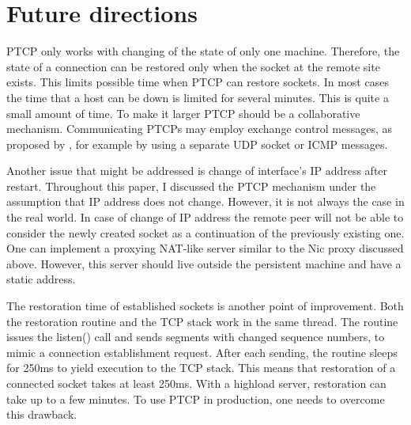 \section{Future directions}

PTCP only works with changing of the state of only one machine. Therefore, the
state of a connection can be restored only when the socket at the remote site
exists. This limits possible time when PTCP can restore sockets. In most
cases the time that a host can be down is limited for several minutes. This is
quite a small amount of time. To make it larger PTCP should be a collaborative
mechanism. Communicating PTCPs may employ exchange control messages, as
proposed by \cite{rocks_racks}, for example by using a separate UDP socket or
ICMP messages.

Another issue that might be addressed is change of interface's IP address after
restart. Throughout this paper, I discussed the PTCP mechanism under the
assumption that IP address does not change. However, it is not always the case
in the real world. In case of change of IP address the remote peer will not be
able to consider the newly created socket as a continuation of the previously
existing one. One can implement a proxying NAT-like server similar to the Nic
proxy discussed above. However, this server should live outside the persistent
machine and have a static address.

The restoration time of established sockets is another point of improvement.
Both the restoration routine and the TCP stack work in the same thread. The
routine issues the listen() call and sends segments with changed sequence
numbers, to mimic a connection establishment request. After each sending, the
routine sleeps for 250ms to yield execution to the TCP stack. This means that
restoration of a connected socket takes at least 250ms. With a highload server,
restoration can take up to a few minutes. To use PTCP in production, one needs
to overcome this drawback.


